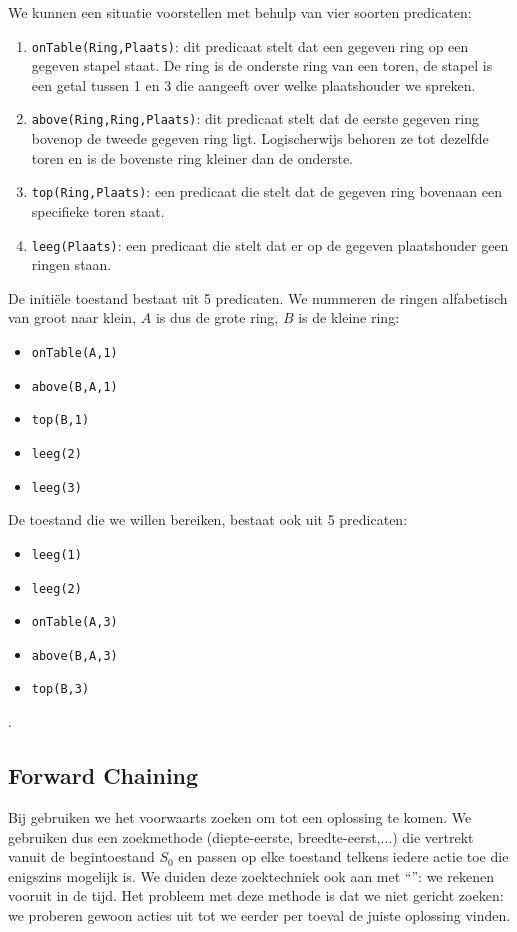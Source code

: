 \begin{leftbar}
We kunnen een situatie voorstellen met behulp van vier soorten predicaten:
\begin{enumerate}
\item \texttt{onTable(Ring,Plaats)}: dit predicaat stelt dat een gegeven ring op een gegeven stapel staat. De ring is de onderste ring van een toren, de stapel is een getal tussen 1 en 3 die aangeeft over welke plaatshouder we spreken.
\item \texttt{above(Ring,Ring,Plaats)}: dit predicaat stelt dat de eerste gegeven ring bovenop de tweede gegeven ring ligt. Logischerwijs behoren ze tot dezelfde toren en is de bovenste ring kleiner dan de onderste.
\item \texttt{top(Ring,Plaats)}: een predicaat die stelt dat de gegeven ring bovenaan een specifieke toren staat.
\item \texttt{leeg(Plaats)}: een predicaat die stelt dat er op de gegeven plaatshouder geen ringen staan.
\end{enumerate}
De initi\"ele toestand bestaat uit 5 predicaten. We nummeren de ringen alfabetisch van groot naar klein, $A$ is dus de grote ring, $B$ is de kleine ring:
\begin{multicols}{3}
\begin{itemize}
 \item \texttt{onTable(A,1)}
 \item \texttt{above(B,A,1)}
 \item \texttt{top(B,1)}
 \item \texttt{leeg(2)}
 \item \texttt{leeg(3)}
\end{itemize}
\end{multicols}
De toestand die we willen bereiken, bestaat ook uit 5 predicaten:
\begin{multicols}{3}
\begin{itemize}
 \item \texttt{leeg(1)}
 \item \texttt{leeg(2)}
 \item \texttt{onTable(A,3)}
 \item \texttt{above(B,A,3)}
 \item \texttt{top(B,3)}
\end{itemize}
\end{multicols}.
\end{leftbar}
\subsection{Forward Chaining}
Bij  gebruiken we het voorwaarts zoeken om tot een oplossing te komen. We gebruiken dus een zoekmethode (diepte-eerste, breedte-eerst,...) die vertrekt vanuit de begintoestand $S_0$ en passen op elke toestand telkens iedere actie toe die enigszins mogelijk is. We duiden deze zoektechniek ook aan met ``'': we rekenen vooruit in de tijd. Het probleem met deze methode is dat we niet gericht zoeken: we proberen gewoon acties uit tot we eerder per toeval de juiste oplossing vinden.
